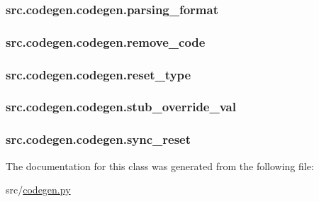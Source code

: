 \hypertarget{classsrc_1_1codegen_1_1codegen_a58d96416c95cad22a87488d65fb6fef5}{
\subsubsection[{parsing\-\_\-format}]{\setlength{\rightskip}{0pt plus 5cm}src.\-codegen.\-codegen.\-parsing\-\_\-format}}\label{classsrc_1_1codegen_1_1codegen_a58d96416c95cad22a87488d65fb6fef5}
\hypertarget{classsrc_1_1codegen_1_1codegen_a99a93980ce41f26c98d7310e896683e8}{
\subsubsection[{remove\-\_\-code}]{\setlength{\rightskip}{0pt plus 5cm}src.\-codegen.\-codegen.\-remove\-\_\-code}}\label{classsrc_1_1codegen_1_1codegen_a99a93980ce41f26c98d7310e896683e8}
\hypertarget{classsrc_1_1codegen_1_1codegen_ab41ce0ced866deb9f87c24ec402bb038}{
\subsubsection[{reset\-\_\-type}]{\setlength{\rightskip}{0pt plus 5cm}src.\-codegen.\-codegen.\-reset\-\_\-type}}\label{classsrc_1_1codegen_1_1codegen_ab41ce0ced866deb9f87c24ec402bb038}
\hypertarget{classsrc_1_1codegen_1_1codegen_acbf0d11c53c3622ca9882109a9426f47}{
\subsubsection[{stub\-\_\-override\-\_\-val}]{\setlength{\rightskip}{0pt plus 5cm}src.\-codegen.\-codegen.\-stub\-\_\-override\-\_\-val}}\label{classsrc_1_1codegen_1_1codegen_acbf0d11c53c3622ca9882109a9426f47}
\hypertarget{classsrc_1_1codegen_1_1codegen_a0dd09f1e941ca7d548ea6a62f4700b12}{
\subsubsection[{sync\-\_\-reset}]{\setlength{\rightskip}{0pt plus 5cm}src.\-codegen.\-codegen.\-sync\-\_\-reset}}\label{classsrc_1_1codegen_1_1codegen_a0dd09f1e941ca7d548ea6a62f4700b12}


The documentation for this class was generated from the following file\-:\begin{DoxyCompactItemize}
\item 
src/\hyperlink{codegen_8py}{codegen.\-py}\end{DoxyCompactItemize}

